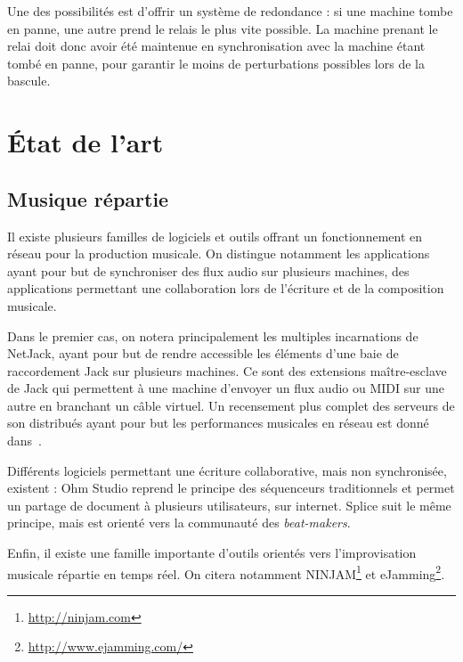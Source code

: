 \documentclass{article}
\newcommand\trigger{point d'interaction\xspace}
\begin{document}
Une des possibilités est d'offrir un système de redondance : si une machine tombe en panne, une autre prend le relais le plus vite possible.
La machine prenant le relai doit donc avoir été maintenue en synchronisation avec la machine étant tombé en panne, pour garantir le moins de perturbations possibles lors de la bascule.
 

\section{État de l'art}
\subsection{Musique répartie}
Il existe plusieurs familles de logiciels et outils offrant un fonctionnement en réseau pour la production musicale.
On distingue notamment les applications ayant pour but de synchroniser des 
flux audio sur plusieurs machines, des applications permettant une collaboration lors 
de l'écriture et de la composition musicale.

Dans le premier cas, on notera principalement les multiples incarnations de NetJack\cite{carot2009netjack}, 
ayant pour but de rendre accessible les éléments d'une baie de raccordement Jack sur plusieurs machines. 
Ce sont des extensions maître-esclave de Jack qui permettent à une machine d'envoyer un flux audio ou MIDI sur une autre en branchant un câble virtuel.
Un recensement plus complet des serveurs de son distribués ayant pour but les performances musicales en réseau est donné dans~\cite{carot2007networked}. 

Différents logiciels permettant une écriture collaborative, mais non synchronisée, existent : 
Ohm Studio\cite{koszolko2015crowdsourcing} reprend le principe des séquenceurs traditionnels et permet un partage de document à plusieurs utilisateurs, sur internet.
Splice\cite{pignato2015deterritorialized} suit le même principe, mais est orienté vers la communauté des \emph{beat-makers}.

Enfin, il existe une famille importante d'outils orientés vers l'improvisation musicale répartie en temps réel\cite{mills2010dislocated}. 
On citera notamment NINJAM\footnote{\url{http://ninjam.com}} et eJamming\footnote{\url{http://www.ejamming.com/}}.
\end{document}
